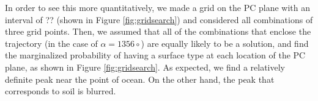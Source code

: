 \documentclass[iop,numberedappendix,apj,]{emulateapj}
\begin{document}
In order to see this more quantitatively, we made a grid on the PC plane  with an interval of ?? (shown in Figure \ref{fig:gridsearch}) and considered all combinations of three grid points. 
Then, we assumed that all of the combinations that enclose the trajectory (in the case of $\alpha = 1356{\circ }$) are equally likely to be a solution, and find the marginalized probability of having a surface type at each location of the PC plane, as shown in Figure \ref{fig:gridsearch}. 
%
As expected, we find a relatively definite peak near the point of ocean. 
On the other hand, the peak that corresponds to soil is blurred. 






\end{document}
